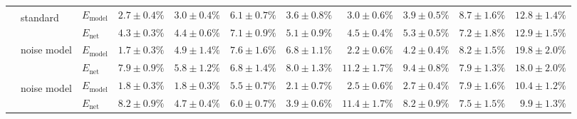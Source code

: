 \begin{sidewaystable}
\begin{tabular}{p{2.2cm} p{1.7cm} l r r r r r r r r }
	&
	\multirow{2}{1.7cm}{\raggedleft %
	standard\textsuperscript{\dag}} &
	$E_\mathrm{model}$ & 
	\color{Gray}$2.7 \pm 0.4\%$ & \color{Gray}$3.0 \pm 0.4\%$ & \color{Gray}$6.1 \pm 0.7\%$ & \color{Gray}$3.6 \pm 0.8\%$ & \color{Gray}$3.0 \pm 0.6\%$ & \color{Gray}$3.9 \pm 0.5\%$ & \color{Gray}$8.7 \pm 1.6\%$ & \color{Gray}$12.8 \pm 1.4\%$
	\\
	& & 
	$E_\mathrm{net}$ &
	\cellcolor{White!100!SteelBlue}$\mathbf{4.3 \pm 0.3\%}$ & \cellcolor{White!100!SteelBlue}$\mathbf{4.4 \pm 0.6\%}$ & \cellcolor{White!88!SteelBlue}$7.1 \pm 0.9\%$ & \cellcolor{White!94!SteelBlue}$5.1 \pm 0.9\%$ & \cellcolor{White!100!SteelBlue}$\mathbf{4.5 \pm 0.4\%}$ & \cellcolor{White!100!SteelBlue}$\mathbf{5.3 \pm 0.5\%}$ & \cellcolor{White!100!SteelBlue}$\mathbf{7.2 \pm 1.8\%}$ & \cellcolor{White!82!SteelBlue}$12.9 \pm 1.5\%$
	\\\cmidrule(l){2-11}
	&
	\multirow{2}{1.7cm}{\raggedleft %
	noise model} &
	$E_\mathrm{model}$ & 
	\color{Gray}$1.7 \pm 0.3\%$ & \color{Gray}$4.9 \pm 1.4\%$ & \color{Gray}$7.6 \pm 1.6\%$ & \color{Gray}$6.8 \pm 1.1\%$ & \color{Gray}$2.2 \pm 0.6\%$ & \color{Gray}$4.2 \pm 0.4\%$ & \color{Gray}$8.2 \pm 1.5\%$ & \color{Gray}$19.8 \pm 2.0\%$
	\\
	& & 
	$E_\mathrm{net}$ &
	\cellcolor{White!50!SteelBlue}$7.9 \pm 0.9\%$ & \cellcolor{White!82!SteelBlue}$5.8 \pm 1.2\%$ & \cellcolor{White!94!SteelBlue}$6.8 \pm 1.4\%$ & \cellcolor{White!82!SteelBlue}$8.0 \pm 1.3\%$ & \cellcolor{White!44!SteelBlue}$11.2 \pm 1.7\%$ & \cellcolor{White!57!SteelBlue}$9.4 \pm 0.8\%$ & \cellcolor{White!88!SteelBlue}$7.9 \pm 1.3\%$ & \cellcolor{White!63!SteelBlue}$18.0 \pm 2.0\%$
	\\\cmidrule(l){2-11}
	&
	\multirow{2}{1.7cm}{\raggedleft %
	noise model\textsuperscript{\dag}} &
	$E_\mathrm{model}$ & 
	\color{Gray}$1.8 \pm 0.3\%$ & \color{Gray}$\mathbf{1.8 \pm 0.3\%}$ & \color{Gray}$\mathbf{5.5 \pm 0.7\%}$ & \color{Gray}$\mathbf{2.1 \pm 0.7\%}$ & \color{Gray}$2.5 \pm 0.6\%$ & \color{Gray}$\mathbf{2.7 \pm 0.4\%}$ & \color{Gray}$\mathbf{7.9 \pm 1.6\%}$ & \color{Gray}$10.4 \pm 1.2\%$
	\\
	& & 
	$E_\mathrm{net}$ &
	\cellcolor{White!44!SteelBlue}$8.2 \pm 0.9\%$ & \cellcolor{White!94!SteelBlue}$4.7 \pm 0.4\%$ & \cellcolor{White!100!SteelBlue}$\mathbf{6.0 \pm 0.7\%}$ & \cellcolor{White!100!SteelBlue}$\mathbf{3.9 \pm 0.6\%}$ & \cellcolor{White!38!SteelBlue}$11.4 \pm 1.7\%$ & \cellcolor{White!63!SteelBlue}$8.2 \pm 0.9\%$ & \cellcolor{White!94!SteelBlue}$7.5 \pm 1.5\%$ & \cellcolor{White!100!SteelBlue}$\mathbf{9.9 \pm 1.3\%}$

\end{tabular}
\end{sidewaystable}
